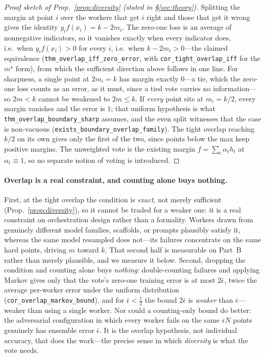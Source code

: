 \begin{proof}[Proof sketch of Prop.~\ref{prop:diversity} (stated in \S\ref{sec:theory})]
Splitting the margin at point $i$ over the workers that get $i$ right and those that get it wrong gives the identity $y_i f(x_i) = k - 2m_i$. The zero-one loss is an average of nonnegative indicators, so it vanishes exactly when every indicator does, i.e.\ when $y_i f(x_i)>0$ for every $i$, i.e.\ when $k-2m_i>0$---the claimed equivalence (\texttt{thm\_overlap\_iff\_zero\_error}, with \texttt{cor\_tight\_overlap\_iff} for the $m^\star$ form), from which the sufficient direction above follows in one line. For sharpness, a single point at $2m_i{=}k$ has margin exactly $0$---a tie, which the zero-one loss counts as an error, as it must, since a tied vote carries no information---so $2m<k$ cannot be weakened to $2m\le k$. If \emph{every} point sits at $m_i{=}k/2$, every margin vanishes and the error is $1$; that uniform hypothesis is what \texttt{thm\_overlap\_boundary\_sharp} assumes, and the even split witnesses that the case is non-vacuous (\texttt{exists\_boundary\_overlap\_family}). The tight overlap reaching $k/2$ on its own gives only the first of the two, since points below the max keep positive margins. The unweighted vote is the existing margin $f=\sum_t\alpha_t h_t$ at $\alpha_t\equiv1$, so no separate notion of voting is introduced.
\end{proof}

\paragraph{Overlap is a real constraint, and counting alone buys nothing.} First, at the tight overlap the condition is \emph{exact}, not merely sufficient (Prop.~\ref{prop:diversity}), so it cannot be traded for a weaker one: it is a real constraint on orchestration design rather than a formality. Workers drawn from genuinely different model families, scaffolds, or prompts plausibly satisfy it, whereas the same model resampled does not---its failures concentrate on the same hard points, driving $m$ toward $k$. That second half is measurable on Part~B rather than merely plausible, and we measure it below. Second, dropping the condition and counting alone buys \emph{nothing}: double-counting failures and applying Markov gives only that the vote's zero-one training error is at most $2\bar{\epsilon}$, twice the average per-worker error under the uniform distribution (\texttt{cor\_overlap\_markov\_bound}), and for $\bar{\epsilon}<\tfrac12$ the bound $2\bar{\epsilon}$ is \emph{weaker} than $\bar{\epsilon}$---weaker than using a single worker. Nor could a counting-only bound do better: the adversarial configuration in which every worker fails on the same $\bar{\epsilon}N$ points genuinely has ensemble error $\bar{\epsilon}$. It is the overlap hypothesis, not individual accuracy, that does the work---the precise sense in which \emph{diversity} is what the vote needs.

